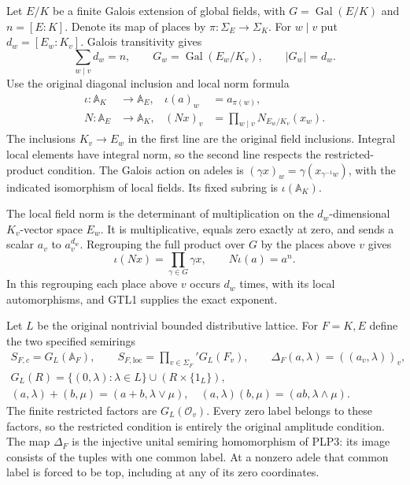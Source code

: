 Let $E/K$ be a finite Galois extension of global fields, with
$G=\operatorname{Gal}(E/K)$ and $n=[E:K]$. Denote its map of places
by $\pi:\Sigma_E\to\Sigma_K$. For $w\mid v$ put
$d_w=[E_w:K_v]$. Galois transitivity gives
\begin{equation}\tag{GTL1}
 \sum_{w\mid v}d_w=n,
 \qquad G_w=\operatorname{Gal}(E_w/K_v),\qquad |G_w|=d_w.
\end{equation}
Use the original diagonal inclusion and local norm formula
\begin{equation}\tag{GTL2}
 \begin{aligned}
 \iota:\mathbb A_K&\longrightarrow\mathbb A_E,
                   &\iota(a)_w&=a_{\pi(w)},\\
 N:\mathbb A_E&\longrightarrow\mathbb A_K,
                   &(Nx)_v&=\prod_{w\mid v}N_{E_w/K_v}(x_w).
 \end{aligned}
\end{equation}
The inclusions $K_v\to E_w$ in the first line are the original
field inclusions. Integral local elements have integral norm,
so the second line respects the restricted-product condition.
The Galois action on adeles is
$(\gamma x)_w=\gamma(x_{\gamma^{-1}w})$, with the indicated
isomorphism of local fields. Its fixed subring is $\iota(\mathbb A_K)$.

The local field norm is the determinant of multiplication on the
$d_w$-dimensional $K_v$-vector space $E_w$. It is multiplicative,
equals zero exactly at zero, and sends a scalar $a_v$ to $a_v^{d_w}$.
Regrouping the full product over $G$ by the places above $v$ gives
\begin{equation}\tag{GTL3}
 \iota(Nx)=\prod_{\gamma\in G}\gamma x,
 \qquad N\iota(a)=a^n.
\end{equation}
In this regrouping each place above $v$ occurs $d_w$ times,
with its local automorphisms, and GTL1 supplies the exact exponent.

Let $L$ be the original nontrivial bounded distributive lattice.
For $F=K,E$ define the two specified semirings
\begin{equation}\tag{GTL4}
 \begin{gathered}
 S_{F,c}=G_L(\mathbb A_F),\qquad
 S_{F,\mathrm{loc}}=\prod_{v\in\Sigma_F}'G_L(F_v),\qquad
 \Delta_F(a,\lambda)=((a_v,\lambda))_v,\\
 G_L(R)=\{(0,\lambda):\lambda\in L\}\cup(R\times\{1_L\}),\\
 (a,\lambda)+(b,\mu)=(a+b,\lambda\vee\mu),\quad
 (a,\lambda)(b,\mu)=(ab,\lambda\wedge\mu).
 \end{gathered}
\end{equation}
The finite restricted factors are $G_L(\mathcal O_v)$.
Every zero label belongs to these factors, so the restricted
condition is entirely the original amplitude condition. The
map $\Delta_F$ is the injective unital semiring homomorphism
of PLP3: its image consists of the tuples with one common label.
At a nonzero adele that common label is forced to be top, including
at any of its zero coordinates.

